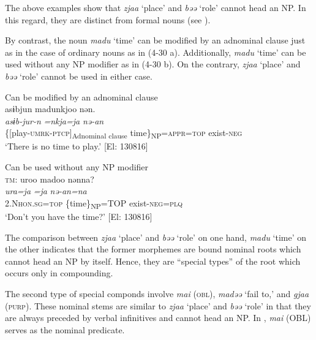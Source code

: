 The above examples show that \textit{zjaa} ‘place’ and \textit{bəə} ‘role’ cannot head an NP. In this regard, they are distinct from formal nouns (see ).

By contrast, the noun \textit{madu} ‘time’ can be modified by an adnominal clause just as in the case of ordinary nouns as in (4-30 a). Additionally, \textit{madu} ‘time’ can be used without any NP modifier as in (4-30 b). On the contrary, \textit{zjaa} ‘place’ and \textit{bəə} ‘role’ cannot be used in either case.

\ea \label{ex:4.30}
\ea Can be modified by an adnominal clause\\\label{ex:4.30a}
\glll  asɨbjun  madunkjoo  nən.\\
    \textit{asɨb-jur-n}  \textit{=nkja=ja}  \textit{nə-an}\\
    \{[play-\textsc{umrk}-\textsc{ptcp}]\textsubscript{Adnominal clause} time\}\textsubscript{NP}=\textsc{appr}=\textsc{top}  exist-\textsc{neg}\\
    \glt     ‘There is no time to play.’ [El: 130816]

\ex Can be used without any NP modifier\\\label{ex:4.30b}
\glll  \textsc{tm}:  uroo  madoo  nənna?\\
    \textit{ura=ja}  \textit{=ja}  \textit{nə-an=na}\\
    2.N\textsc{hon}.\textsc{sg}=\textsc{top}\textsubscript{} \{time\}\textsubscript{NP}=TOP  exist-\textsc{neg}=\textsc{plq}\\
    \glt     ‘Don’t you have the time?’ [El: 130816]
\z
\z

The comparison between \textit{zjaa} ‘place’ and \textit{bəə} ‘role’ on one hand, \textit{madu} ‘time’ on the other indicates that the former morphemes are bound nominal roots which cannot head an NP by itself. Hence, they are “special types” of the root which occurs only in compounding.

The second type of special componds involve \textit{mai} (\textsc{obl}), \textit{madəə} ‘fail to,’ and \textit{gjaa} (\textsc{purp}). These nominal stems are similar to \textit{zjaa} ‘place’ and \textit{bəə} ‘role’ in that they are always preceded by verbal infinitives and cannot head an NP. In , \textit{mai} (OBL) serves as the nominal predicate.

